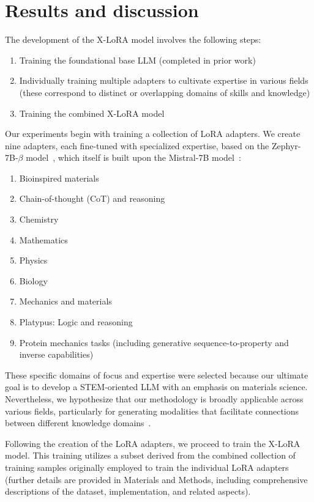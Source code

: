 \section{Results and discussion}

The development of the X-LoRA model involves the following steps:

\begin{enumerate}
    \item Training the foundational base LLM (completed in prior work) \item Individually training multiple adapters to cultivate expertise in various fields (these correspond to distinct or overlapping domains of skills and knowledge) \item Training the combined X-LoRA model
\end{enumerate}

Our experiments begin with training a collection of LoRA adapters. We create nine adapters, each fine-tuned with specialized expertise, based on the Zephyr-7B-$\beta$ model~\cite{HuggingFaceH4/zephyr-7b-betaFace}, which itself is built upon the Mistral-7B model~\cite{Jiang2023Mistral7B}:

\begin{enumerate}
    \item Bioinspired materials \item Chain-of-thought (CoT) and reasoning \item Chemistry \item Mathematics \item Physics \item Biology \item Mechanics and materials \item Platypus: Logic and reasoning \item Protein mechanics tasks (including generative sequence-to-property and inverse capabilities)
\end{enumerate}

These specific domains of focus and expertise were selected because our ultimate goal is to develop a STEM-oriented LLM with an emphasis on materials science. Nevertheless, we hypothesize that our methodology is broadly applicable across various fields, particularly for generating modalities that facilitate connections between different knowledge domains~\cite{Buehler2023MechGPTModalities,Buehler2023MeLMProblemsb}.

Following the creation of the LoRA adapters, we proceed to train the X-LoRA model. This training utilizes a subset derived from the combined collection of training samples originally employed to train the individual LoRA adapters (further details are provided in Materials and Methods, including comprehensive descriptions of the dataset, implementation, and related aspects).

